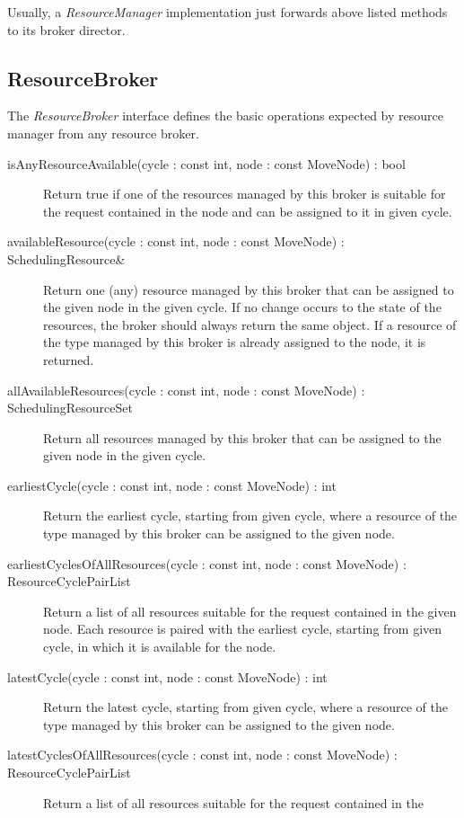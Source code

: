 \documentclass[a4paper,twoside]{tce}
\begin{document}
Usually, a \emph{ResourceManager} implementation just forwards above listed
methods to its broker director.

\subsection{ResourceBroker}
\label{ssec:ResourceBroker-if}

The \emph{ResourceBroker} interface defines the basic operations expected
by resource manager from any resource broker.
\begin{description}
\item[isAnyResourceAvailable(cycle : const int, node : const MoveNode) : bool]%
  Return true if one of the resources managed by this broker is suitable for
  the request contained in the node and can be assigned to it in given
  cycle.
\item[availableResource(cycle : const int, node : const MoveNode) :
  SchedulingResource\&]%
  Return one (any) resource managed by this broker that can be assigned to
  the given node in the given cycle. If no change occurs to the state of the
  resources, the broker should always return the same object. If a resource
  of the type managed by this broker is already assigned to the node, it is
  returned.
\item[allAvailableResources(cycle : const int, node : const MoveNode) :
  SchedulingResourceSet]%
  Return all resources managed by this broker that can be assigned to the
  given node in the given cycle.
\item[earliestCycle(cycle : const int, node : const MoveNode) : int]%
  Return the earliest cycle, starting from given cycle, where a resource
  of the type managed by this broker can be assigned to the given node.
\item[earliestCyclesOfAllResources(cycle : const int, node : const MoveNode) :
  ResourceCyclePairList]%
  Return a list of all resources suitable for the request contained in the
  given node. Each resource is paired with the earliest cycle, starting from
  given cycle, in which it is available for the node.
\item[latestCycle(cycle : const int, node : const MoveNode) : int]%
  Return the latest cycle, starting from given cycle, where a resource
  of the type managed by this broker can be assigned to the given node.
\item[latestCyclesOfAllResources(cycle : const int, node : const MoveNode) :
  ResourceCyclePairList]%
  Return a list of all resources suitable for the request contained in the

\end{description}
\end{document}
